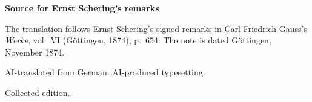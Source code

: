 \clearpage\thispagestyle{empty}
\begin{center}\Large\bfseries Source for Ernst Schering’s remarks\end{center}

The translation follows Ernst Schering’s signed remarks in Carl Friedrich Gauss’s \emph{Werke}, vol.~VI (Göttingen, 1874), p.~654. The note is dated Göttingen, November 1874.

AI-translated from German. AI-produced typesetting.

\href{https://gdz.sub.uni-goettingen.de/id/PPN236007467}{Collected edition}.

\clearpage
